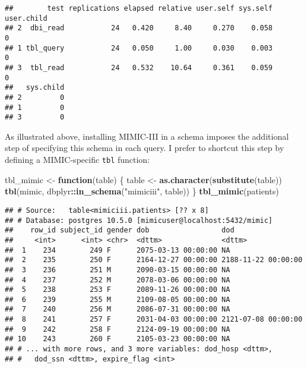 \documentclass[]{article}
\newenvironment{Shaded}{\begin{snugshade}}{\end{snugshade}}
\newcommand{\KeywordTok}[1]{\textcolor[rgb]{0.13,0.29,0.53}{\textbf{#1}}}
\newcommand{\StringTok}[1]{\textcolor[rgb]{0.31,0.60,0.02}{#1}}
\newcommand{\ControlFlowTok}[1]{\textcolor[rgb]{0.13,0.29,0.53}{\textbf{#1}}}
\newcommand{\OperatorTok}[1]{\textcolor[rgb]{0.81,0.36,0.00}{\textbf{#1}}}
\newcommand{\NormalTok}[1]{#1}
\begin{document}
\begin{verbatim}
##        test replications elapsed relative user.self sys.self user.child
## 2  dbi_read           24   0.420     8.40     0.270    0.058          0
## 1 tbl_query           24   0.050     1.00     0.030    0.003          0
## 3  tbl_read           24   0.532    10.64     0.361    0.059          0
##   sys.child
## 2         0
## 1         0
## 3         0
\end{verbatim}

As illustrated above, installing MIMIC-III in a schema imposes the
additional step of specifying this schema in each query. I prefer to
shortcut this step by defining a MIMIC-specific \texttt{tbl} function:

\begin{Shaded}
\begin{Highlighting}[]
\NormalTok{tbl_mimic <-}\StringTok{ }\ControlFlowTok{function}\NormalTok{(table) \{}
\NormalTok{  table <-}\StringTok{ }\KeywordTok{as.character}\NormalTok{(}\KeywordTok{substitute}\NormalTok{(table))}
  \KeywordTok{tbl}\NormalTok{(mimic, dbplyr}\OperatorTok{::}\KeywordTok{in_schema}\NormalTok{(}\StringTok{"mimiciii"}\NormalTok{, table))}
\NormalTok{\}}
\KeywordTok{tbl_mimic}\NormalTok{(patients)}
\end{Highlighting}
\end{Shaded}

\begin{verbatim}
## # Source:   table<mimiciii.patients> [?? x 8]
## # Database: postgres 10.5.0 [mimicuser@localhost:5432/mimic]
##    row_id subject_id gender dob                 dod                
##     <int>      <int> <chr>  <dttm>              <dttm>             
##  1    234        249 F      2075-03-13 00:00:00 NA                 
##  2    235        250 F      2164-12-27 00:00:00 2188-11-22 00:00:00
##  3    236        251 M      2090-03-15 00:00:00 NA                 
##  4    237        252 M      2078-03-06 00:00:00 NA                 
##  5    238        253 F      2089-11-26 00:00:00 NA                 
##  6    239        255 M      2109-08-05 00:00:00 NA                 
##  7    240        256 M      2086-07-31 00:00:00 NA                 
##  8    241        257 F      2031-04-03 00:00:00 2121-07-08 00:00:00
##  9    242        258 F      2124-09-19 00:00:00 NA                 
## 10    243        260 F      2105-03-23 00:00:00 NA                 
## # ... with more rows, and 3 more variables: dod_hosp <dttm>,
## #   dod_ssn <dttm>, expire_flag <int>
\end{verbatim}
\end{document}

